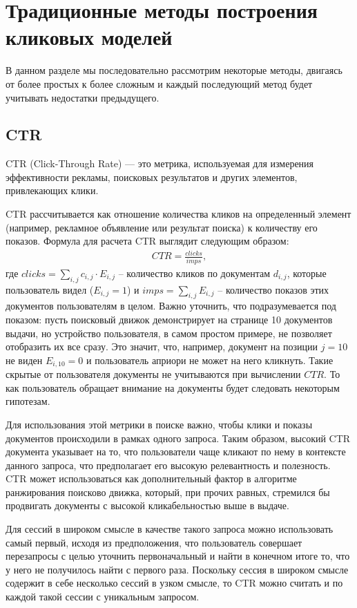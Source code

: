 \documentclass[diploma]{nanolab2015}
\begin{document}
\section{Традиционные методы построения кликовых моделей}
В данном разделе мы последовательно рассмотрим некоторые методы, двигаясь от более простых к более сложным и каждый последующий метод будет учитывать недостатки предыдущего.
\subsection{CTR}
CTR (Click-Through Rate) — это метрика, используемая для измерения эффективности рекламы, поисковых результатов и других элементов, привлекающих клики. %

CTR рассчитывается как отношение количества кликов на определенный элемент (например, рекламное объявление или результат поиска) к количеству его показов. Формула для расчета CTR выглядит следующим образом:
\begin{align}
    CTR = \frac{clicks}{imps},
\end{align}
где $clicks = \sum_{i,j} c_{i,j} \cdot E_{i,j}$ -- количество кликов по документам $d_{i,j}$, которые пользователь видел ($E_{i,j}=1$) и $imps = \sum_{i,j}E_{i,j}$ -- количество показов этих документов пользователям в целом. Важно уточнить, что подразумевается под показом: пусть поисковый движок демонстрирует на странице 10 документов выдачи, но устройство пользователя, в самом простом примере, не позволяет отобразить их все сразу. Это значит, что, например, документ на позиции $j=10$ не виден $E_{i,10} = 0$ и пользователь априори не может на него кликнуть. Такие скрытые от пользователя документы не учитываются при вычислении $CTR$. То как пользователь обращает внимание на документы будет следовать некоторым гипотезам.

Для использования этой метрики в поиске важно, чтобы клики и показы документов происходили в рамках одного запроса. Таким образом, высокий CTR документа указывает на то, что пользователи чаще кликают по нему в контексте данного запроса, что предполагает его высокую релевантность и полезность. CTR может использоваться как дополнительный фактор в алгоритме ранжирования поисково движка, который, при прочих равных, стремился бы продвигать документы с высокой кликабельностью выше в выдаче.

Для сессий в широком смысле в качестве такого запроса можно использовать самый первый, исходя из предположения, что пользователь совершает перезапросы с целью уточнить первоначальный и найти в конечном итоге то, что у него не получилось найти с первого раза. Поскольку сессия в широком смысле содержит в себе несколько сессий в узком смысле, то CTR можно считать и по каждой такой сессии с уникальным запросом.
\end{document}
